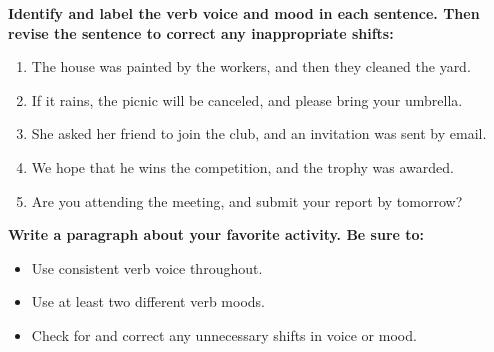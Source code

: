 \documentclass[12pt]{article}
\begin{document}
\vspace{1em}

\begin{tcolorbox}[colframe=black!60, colback=white, 
coltitle=black, colbacktitle=black!15, fonttitle=\bfseries\Large, 
title=Practice with Voice and Mood, halign title=center, left=10pt, right=10pt, top=10pt, bottom=15pt]
\textbf{Identify and label the verb voice and mood in each sentence. Then revise the sentence to correct any inappropriate shifts:}
\begin{enumerate}[itemsep=3em]
    \item The house was painted by the workers, and then they cleaned the yard.  
    \item If it rains, the picnic will be canceled, and please bring your umbrella.  
    \item She asked her friend to join the club, and an invitation was sent by email.  
    \item We hope that he wins the competition, and the trophy was awarded.  
    \item Are you attending the meeting, and submit your report by tomorrow?
\end{enumerate}
\end{tcolorbox}

\vspace{1em}

\begin{tcolorbox}[colframe=black!60, colback=white, 
coltitle=black, colbacktitle=black!15, fonttitle=\bfseries\Large, 
title=Exit Ticket, halign title=center, left=10pt, right=10pt, top=5pt, bottom=15pt]

\textbf{Write a paragraph about your favorite activity. Be sure to:}
\begin{itemize}
    \item Use consistent verb voice throughout.  
    \item Use at least two different verb moods.  
    \item Check for and correct any unnecessary shifts in voice or mood.  
\end{itemize}

\vspace{8em}

\end{tcolorbox}
\end{document}
